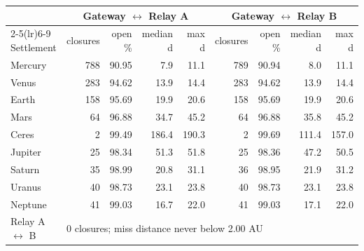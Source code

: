 \begin{tabular}{l rrrr rrrr}
\toprule
 & \multicolumn{4}{c}{Gateway $\leftrightarrow$ Relay A} & \multicolumn{4}{c}{Gateway $\leftrightarrow$ Relay B}\\
\cmidrule(lr){2-5}\cmidrule(lr){6-9}
Settlement & closures & open \% & median d & max d & closures & open \% & median d & max d\\
\midrule
Mercury & 788 & 90.95 & 7.9 & 11.1 & 789 & 90.94 & 8.0 & 11.1\\
Venus & 283 & 94.62 & 13.9 & 14.4 & 283 & 94.62 & 13.9 & 14.4\\
Earth & 158 & 95.69 & 19.9 & 20.6 & 158 & 95.69 & 19.9 & 20.6\\
Mars & 64 & 96.88 & 34.7 & 45.2 & 64 & 96.88 & 35.8 & 45.2\\
Ceres & 2 & 99.49 & 186.4 & 190.3 & 2 & 99.69 & 111.4 & 157.0\\
Jupiter & 25 & 98.34 & 51.3 & 51.8 & 25 & 98.36 & 47.2 & 50.5\\
Saturn & 35 & 98.99 & 20.8 & 31.1 & 36 & 98.95 & 21.9 & 31.2\\
Uranus & 40 & 98.73 & 23.1 & 23.8 & 40 & 98.73 & 23.1 & 23.8\\
Neptune & 41 & 99.03 & 16.7 & 22.0 & 41 & 99.03 & 17.1 & 22.0\\
\midrule
Relay A $\leftrightarrow$ B & \multicolumn{8}{l}{0 closures; miss distance never below 2.00 AU}\\
\bottomrule
\end{tabular}
